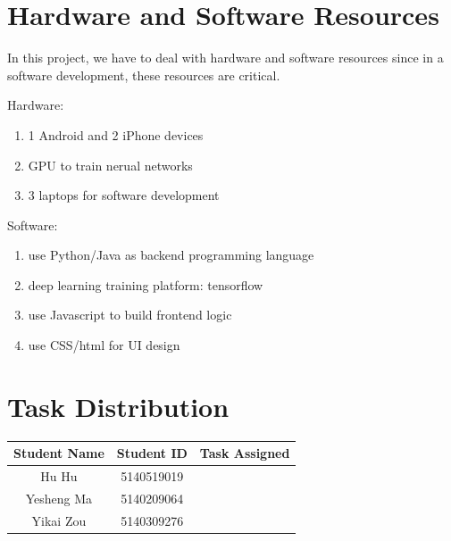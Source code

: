 \documentclass[12pt]{article}
\begin{document}
\section{Hardware and Software Resources}
In this project, we have to deal with hardware and software resources since 
in a software development, these resources are critical.

Hardware:
\begin{enumerate}
\item 1 Android and 2 iPhone devices
\item GPU to train nerual networks
\item 3 laptops for software development
\end{enumerate}

Software:
\begin{enumerate}
\item use Python/Java as backend programming language
\item deep learning training platform: tensorflow
\item use Javascript to build frontend logic
\item use CSS/html for UI design
\end{enumerate}



\section{Task Distribution}
\begin{table}[H]
	\centering
	\begin{tabular}{|c|c|c|}
		\hline
		Student Name & Student ID & Task Assigned \\
		\hline
		Hu Hu & 5140519019 &  \\
		\hline
		Yesheng Ma & 5140209064 & \\
		\hline
		Yikai Zou & 5140309276 & \\
		\hline
	\end{tabular}
\end{table}
\end{document}
